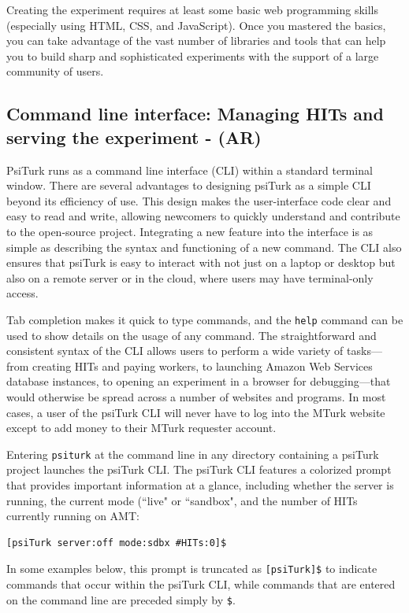\documentclass[twocolumn]{svjour3}          %
\begin{document}
Creating the experiment requires at least some basic web programming skills (especially using HTML, CSS, and JavaScript).
Once you mastered the basics, you can take advantage of the vast number of libraries and tools that can help you to build sharp and sophisticated experiments with the support of a large community of users.


\subsection{Command line interface: Managing HITs and serving the experiment - (AR)}

PsiTurk runs as a command line interface (CLI) within a standard terminal window.
There are several advantages to designing psiTurk as a simple CLI beyond its efficiency of use. This
design makes the user-interface code clear and easy to read and write, allowing newcomers to quickly
understand and contribute to the open-source project. Integrating a new feature into the interface
is as simple as describing the syntax and functioning of a new command. The CLI also ensures that
psiTurk is easy to interact with not just on a laptop or desktop but also on a remote server or in
the cloud, where users may have terminal-only access.
 
Tab completion makes it quick to type commands, and the \texttt{help} command can be used to show
details on the usage of any command. 
The straightforward and consistent syntax of the CLI allows
users to perform a wide variety of tasks---from creating HITs and paying workers, to launching Amazon
Web Services database instances, to opening an experiment in a browser for debugging---that
would otherwise be spread across a number of websites and programs. In most cases, a user of the
psiTurk CLI will never have to log into the MTurk website except to add money to their MTurk
requester account.


Entering
\texttt{psiturk} at the command line in any directory containing a psiTurk project launches the
psiTurk CLI.
The psiTurk CLI features a colorized prompt that provides important information at a glance, including
whether the server is running, the current mode (``live" or ``sandbox", and the number of HITs currently running on AMT:

\begin{lstlisting}
[psiTurk server:off mode:sdbx #HITs:0]$
\end{lstlisting}

\noindent In some examples below, this prompt is truncated as \texttt{[psiTurk]\$} to indicate commands that occur within the psiTurk CLI, while commands that are entered on the command line are preceded simply by \texttt{\$}.
\end{document}

